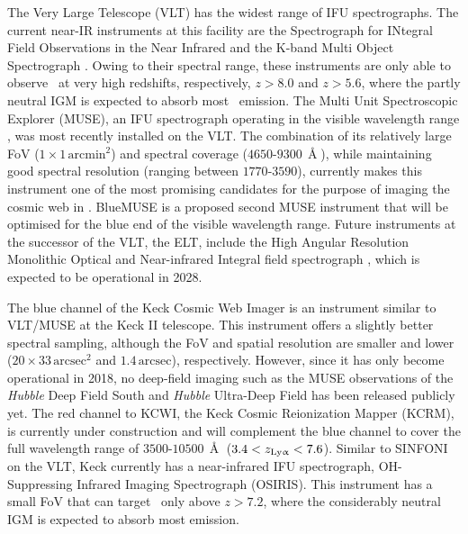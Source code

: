 The Very Large Telescope (VLT) has the widest range of IFU spectrographs. The current near-IR instruments at this facility are the Spectrograph for INtegral Field Observations in the Near Infrared \citep[SINFONI, see][]{2003SPIE.4841.1548E, 2004Msngr.117...17B} and the K-band Multi Object Spectrograph \citep[KMOS, see][]{2013Msngr.151...21S}. Owing to their spectral range, these instruments are only able to observe \lya\ at very high redshifts, respectively, $z > 8.0$ and $z > 5.6$, where the partly neutral IGM is expected to absorb most \lya\ emission. The Multi Unit Spectroscopic Explorer (MUSE), an IFU spectrograph operating in the visible wavelength range \citep[see][]{2010SPIE.7735E..08B}, was most recently installed on the VLT. The combination of its relatively large FoV ($1 \times 1 \, \mathrm{arcmin}^2$) and spectral coverage ($4650$-$9300 \, \Angstrom$), while maintaining good spectral resolution (ranging between $1770$-$3590$), currently makes this instrument one of the most promising candidates for the purpose of imaging the cosmic web in \lya. BlueMUSE \citep{2019arXiv190601657R} is a proposed second MUSE instrument that will be optimised for the blue end of the visible wavelength range. Future instruments at the successor of the VLT, the ELT, include the High Angular Resolution Monolithic Optical and Near-infrared Integral field spectrograph \citep[HARMONI, see][]{2014SPIE.9147E..25T}, which is expected to be operational in 2028.

The blue channel of the Keck Cosmic Web Imager \citep[KCWI, see][]{2018ApJ...864...93M} is an instrument similar to VLT/MUSE at the Keck II telescope. This instrument offers a slightly better spectral sampling, although the FoV and spatial resolution are smaller and lower ($20 \times 33 \, \mathrm{arcsec}^2$ and $1.4 \, \mathrm{arcsec}$), respectively. However, since it has only become operational in 2018, no deep-field imaging such as the MUSE observations of the \textit{Hubble} Deep Field South and \textit{Hubble} Ultra-Deep Field \citep{2015A&A...575A..75B, 2017A&A...608A...1B} has been released publicly yet. The red channel to KCWI, the Keck Cosmic Reionization Mapper (KCRM), is currently under construction and will complement the blue channel to cover the full wavelength range of $3500$-$10500 \, \Angstrom$ ($3.4<z_\text{{Ly\ensuremath{\upalpha}}}<7.6$). Similar to SINFONI on the VLT, Keck currently has a near-infrared IFU spectrograph, OH-Suppressing Infrared Imaging Spectrograph (OSIRIS). This instrument has a small FoV that can target \lya\ only above $z>7.2$, where the considerably neutral IGM is expected to absorb most emission.

